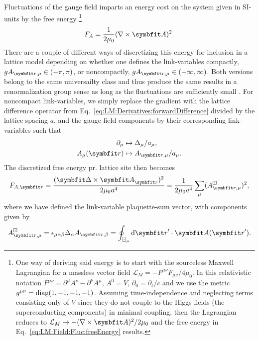Fluctuations of the gauge field imparts an energy cost on the system given in SI-units by the free energy%
\footnote{One way of deriving said energy is to start with the sourceless
Maxwell Lagrangian for a massless vector field
$\mathcal{L}_M = -F^{\mu\nu}F_{\mu\nu}/4\mu_0$. In this relativistic notation $F^{\mu\nu} = \partial^\mu A^\nu-\partial^\nu A^\mu$, $A^0 = V$, $\partial_0 = \partial_t/c$ and we use  the
metric $g^{\mu\nu} = \operatorname{diag}(1, -1, -1, -1)$. Assuming time-independence and neglecting terms consisting only of $V$ since they do not couple to the Higgs fields (\eg the superconducting
components) in minimal coupling, then the Lagrangian reduces to $\mathcal{L}_M \to -(\nabla\times\v{A})^2/2\mu_0$ and the free energy in Eq.~\eqref{eq:LM:Field:Fluc:freeEnergy} results.}
\begin{equation}
    \label{eq:LM:Field:Fluc:freeEnergy}
    F_A = \frac{1}{2\mu_0}(\nabla\times\v{A})^2.
\end{equation}
There are a couple of different ways of discretizing this energy for inclusion in a lattice model depending on whether one defines the link-variables compactly,
\ie $gA_{\v{r},\mu} \in (-\pi, \pi)$, or noncompactly, \ie $gA_{\v{r},\mu} \in (-\infty,\infty)$. Both versions belong to the same universailty class and thus produce the same
results in a renormalization group sense as long as the fluctuations are sufficiently small \cite{shimizu12}. For noncompact link-variables, we simply replace the gradient with the
lattice difference operator from Eq.~\eqref{eq:LM:Derivatives:forwardDifference} divided by the lattice spacing $a$, 
and the gauge-field components by their corresponding link-variables such that
\begin{equation}
    \label{eq:LM:Field:Fluc:discretization}
    \begin{split}
        \partial_\mu &\mapsto \Delta_\mu/a_\mu,\\
        A_\mu(\v{r}) &\mapsto A_{\v{r},\mu}/a_\mu.
    \end{split}
\end{equation}
The discretized free energy pr. lattice site then becomes
\begin{equation}
    \label{eq:LM:Field:Fluc:discretizedFreeEnergy}
    F_{A,\v{r}} = \frac{(\v{\Delta}\times\v{A}_\v{r})^2}{2\mu_0a^4} = \frac{1}{2\mu_0a^4}\sum_\mu(A^\boxdot_{\v{r},\mu})^2,
\end{equation}
where we have defined the link-variable plaquette-sum vector, with components given by
\begin{equation}
    \label{eq:LM:Field:Fluc:plaquetteSum}
    A^\boxdot_{\v{r},\mu} = \epsilon_{\mu\alpha\beta}\Delta_\alpha A_{\v{r},\beta} = \oint_{\boxdot_\mu} \mathrm{d}\v{r}'\cdot\v{A}(\v{r}').
\end{equation}
